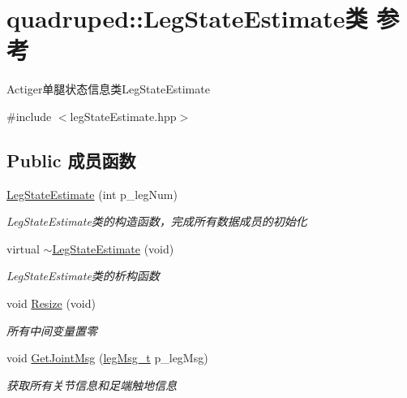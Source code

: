 \hypertarget{classquadruped_1_1LegStateEstimate}{}\section{quadruped\+:\+:Leg\+State\+Estimate类 参考}
\label{classquadruped_1_1LegStateEstimate}


Actiger单腿状态信息类\+Leg\+State\+Estimate  




{\ttfamily \#include $<$leg\+State\+Estimate.\+hpp$>$}

\subsection*{Public 成员函数}
\begin{DoxyCompactItemize}
\item 
\hyperlink{classquadruped_1_1LegStateEstimate_ab66c4db78288cf0c25d4c2477e8c0a7b}{Leg\+State\+Estimate} (int p\+\_\+leg\+Num)
\begin{DoxyCompactList}\small\item\em Leg\+State\+Estimate类的构造函数，完成所有数据成员的初始化 \end{DoxyCompactList}\item 
\mbox{\label{classquadruped_1_1LegStateEstimate_ad8c57206ac03f20ec601b38b0c3f593c}} 
virtual \hyperlink{classquadruped_1_1LegStateEstimate_ad8c57206ac03f20ec601b38b0c3f593c}{$\sim$\+Leg\+State\+Estimate} (void)
\begin{DoxyCompactList}\small\item\em Leg\+State\+Estimate类的析构函数 \end{DoxyCompactList}\item 
\mbox{\label{classquadruped_1_1LegStateEstimate_acb65dbf36f5042cd5e257fec9264075f}} 
void \hyperlink{classquadruped_1_1LegStateEstimate_acb65dbf36f5042cd5e257fec9264075f}{Resize} (void)
\begin{DoxyCompactList}\small\item\em 所有中间变量置零 \end{DoxyCompactList}\item 
void \hyperlink{classquadruped_1_1LegStateEstimate_ab6c64146d3ea706ed1556b1896c6fa05}{Get\+Joint\+Msg} (\hyperlink{structlegMsg__t}{leg\+Msg\+\_\+t} p\+\_\+leg\+Msg)
\begin{DoxyCompactList}\small\item\em 获取所有关节信息和足端触地信息 \end{DoxyCompactList}\item 

\end{DoxyCompactItemize}
